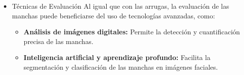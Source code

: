 \begin{itemize}
\item Técnicas de Evaluación
Al igual que con las arrugas, la evaluación de las manchas puede beneficiarse del uso de tecnologías avanzadas, como:
\begin{itemize} 
\item \textbf{Análisis de imágenes digitales:} Permite la detección y cuantificación precisa de las manchas. \parencite{gupta2023skin}
\item \textbf{Inteligencia artificial y aprendizaje profundo:} Facilita la segmentación y clasificación de las manchas en imágenes faciales. \parencite{gupta2023skin}
\end{itemize}
\end{itemize}




